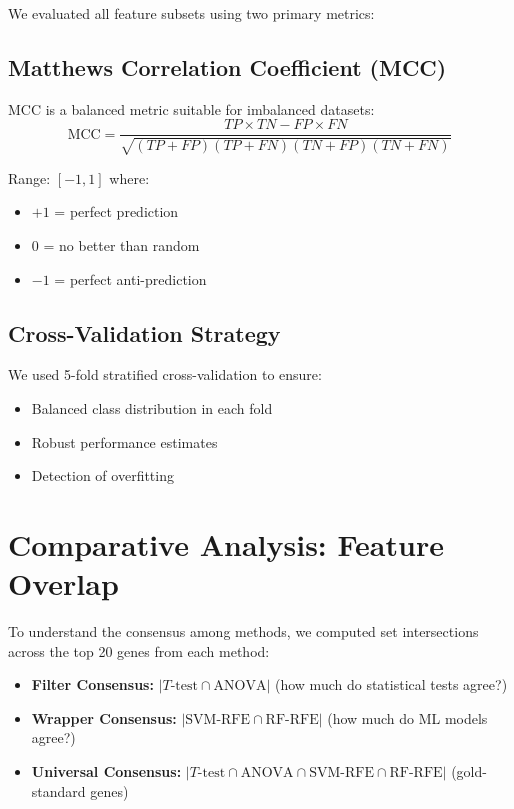 We evaluated all feature subsets using two primary metrics:

\subsection{Matthews Correlation Coefficient (MCC)}

MCC is a balanced metric suitable for imbalanced datasets:
\begin{equation}
    \text{MCC} = \frac{TP \times TN - FP \times FN}{\sqrt{(TP+FP)(TP+FN)(TN+FP)(TN+FN)}}
\end{equation}

Range: $[-1, 1]$ where:
\begin{itemize}
    \item $+1$ = perfect prediction
    \item $0$ = no better than random
    \item $-1$ = perfect anti-prediction
\end{itemize}

\subsection{Cross-Validation Strategy}

We used 5-fold stratified cross-validation to ensure:
\begin{itemize}
    \item Balanced class distribution in each fold
    \item Robust performance estimates
    \item Detection of overfitting
\end{itemize}

\section{Comparative Analysis: Feature Overlap}

To understand the consensus among methods, we computed set intersections across the top 20 genes from each method:
\begin{itemize}
    \item \textbf{Filter Consensus:} $|T\text{-test} \cap \text{ANOVA}|$ (how much do statistical tests agree?)
    \item \textbf{Wrapper Consensus:} $|\text{SVM-RFE} \cap \text{RF-RFE}|$ (how much do ML models agree?)
    \item \textbf{Universal Consensus:} $|T\text{-test} \cap \text{ANOVA} \cap \text{SVM-RFE} \cap \text{RF-RFE}|$ (gold-standard genes)
\end{itemize}
